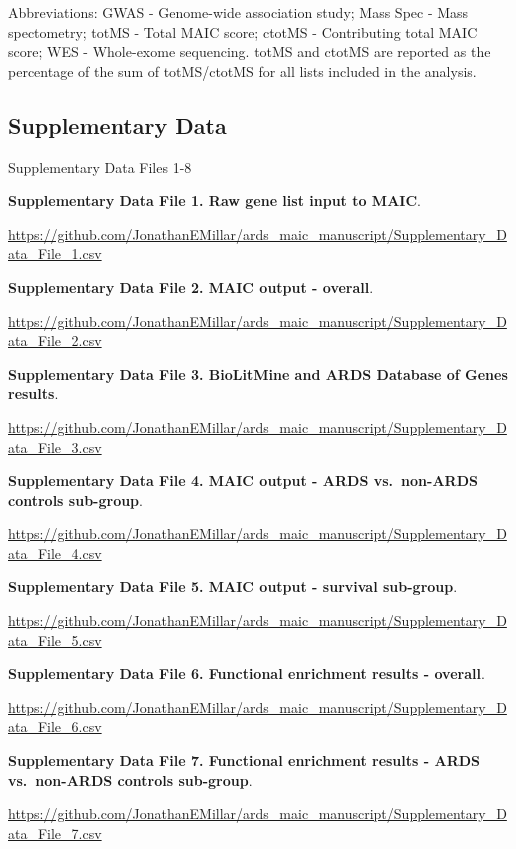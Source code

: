 \documentclass[
  11,
  a4paper,
]{article}
\begin{document}
\begin{scriptsize}
Abbreviations: GWAS - Genome-wide association study; Mass Spec - Mass spectometry; totMS - Total MAIC score; ctotMS - Contributing total MAIC score; WES - Whole-exome sequencing. totMS and ctotMS are reported as the percentage of the sum of totMS/ctotMS for all lists included in the analysis.
\end{scriptsize}

\newpage

\subsection{Supplementary Data}\label{supplementary-data}

Supplementary Data Files 1-8

\newpage

\textbf{Supplementary Data File 1. Raw gene list input to MAIC}.

\url{https://github.com/JonathanEMillar/ards_maic_manuscript/Supplementary_Data_File_1.csv}

\textbf{Supplementary Data File 2. MAIC output - overall}.

\url{https://github.com/JonathanEMillar/ards_maic_manuscript/Supplementary_Data_File_2.csv}

\textbf{Supplementary Data File 3. BioLitMine and ARDS Database of Genes
results}.

\url{https://github.com/JonathanEMillar/ards_maic_manuscript/Supplementary_Data_File_3.csv}

\textbf{Supplementary Data File 4. MAIC output - ARDS vs.~non-ARDS
controls sub-group}.

\url{https://github.com/JonathanEMillar/ards_maic_manuscript/Supplementary_Data_File_4.csv}

\textbf{Supplementary Data File 5. MAIC output - survival sub-group}.

\url{https://github.com/JonathanEMillar/ards_maic_manuscript/Supplementary_Data_File_5.csv}

\textbf{Supplementary Data File 6. Functional enrichment results -
overall}.

\url{https://github.com/JonathanEMillar/ards_maic_manuscript/Supplementary_Data_File_6.csv}

\textbf{Supplementary Data File 7. Functional enrichment results - ARDS
vs.~non-ARDS controls sub-group}.

\url{https://github.com/JonathanEMillar/ards_maic_manuscript/Supplementary_Data_File_7.csv}
\end{document}
